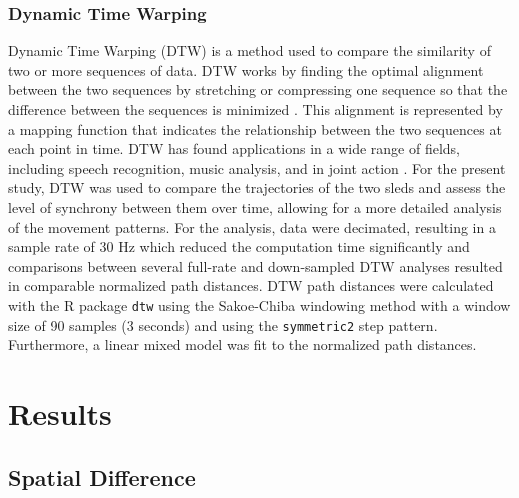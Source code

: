 \documentclass[10pt,a4paper,onecolumn]{article}
\begin{document}
\hypertarget{dynamic-time-warping}{%
\subsubsection{Dynamic Time Warping}\label{dynamic-time-warping}}

Dynamic Time Warping (DTW) is a method used to compare the similarity of two or more sequences of data. DTW works by finding the optimal alignment between the two sequences by stretching or compressing one sequence so that the difference between the sequences is minimized \autocite{mullerDynamicTimeWarping2007}. This alignment is represented by a mapping function that indicates the relationship between the two sequences at each point in time. DTW has found applications in a wide range of fields, including speech recognition, music analysis, and in joint action \autocite{hochDancingTogetherInfant2021}. For the present study, DTW was used to compare the trajectories of the two sleds and assess the level of synchrony between them over time, allowing for a more detailed analysis of the movement patterns. For the analysis, data were decimated, resulting in a sample rate of 30 Hz which reduced the computation time significantly and comparisons between several full-rate and down-sampled DTW analyses resulted in comparable normalized path distances. DTW path distances were calculated with the R package \texttt{dtw} \autocite{R-dtw} using the Sakoe-Chiba windowing method \autocite{gelerDynamicTimeWarping2019} with a window size of 90 samples (3 seconds) and using the \texttt{symmetric2} step pattern. Furthermore, a linear mixed model was fit to the normalized path distances.

\hypertarget{results}{%
\section{Results}\label{results}}

\hypertarget{spatial-difference}{%
\subsection{Spatial Difference}\label{spatial-difference}}
\end{document}
